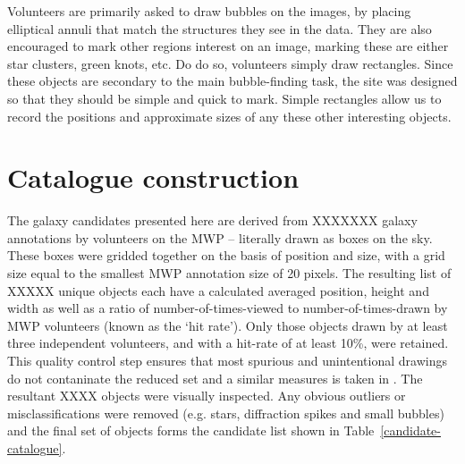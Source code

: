 \documentclass[times,usenatbib]{mn2e}
\begin{document}
Volunteers are primarily asked to draw bubbles on the images, by placing elliptical annuli that match the structures they see in the data. They are also encouraged to mark other regions interest on an image, marking these are either star clusters, green knots, etc. Do do so, volunteers simply draw rectangles. Since these objects are secondary to the main bubble-finding task, the site was designed so that they should be simple and quick to mark. Simple rectangles allow us to record the positions and approximate sizes of any these other interesting objects.

\section{Catalogue construction}

The galaxy candidates presented here are derived from XXXXXXX galaxy annotations by volunteers on the MWP -- literally drawn as boxes on the sky. These boxes were gridded together on the basis of position and size, with a grid size equal to the smallest MWP annotation size of 20 pixels. The resulting list of XXXXX unique objects each have a calculated averaged position, height and width as well as a ratio of number-of-times-viewed to number-of-times-drawn by MWP volunteers (known as the `hit rate'). Only those objects drawn by at least three independent volunteers, and with a hit-rate of at least 10\%, were retained. This quality control step ensures that most spurious and unintentional drawings do not contaninate the reduced set and a similar measures is taken in \citet{Simpson+12}. The resultant XXXX objects were visually inspected. Any obvious outliers or misclassifications were removed (e.g. stars, diffraction spikes and small bubbles) and the final set of objects forms the candidate list shown in Table~\ref{candidate-catalogue}.
\end{document}
